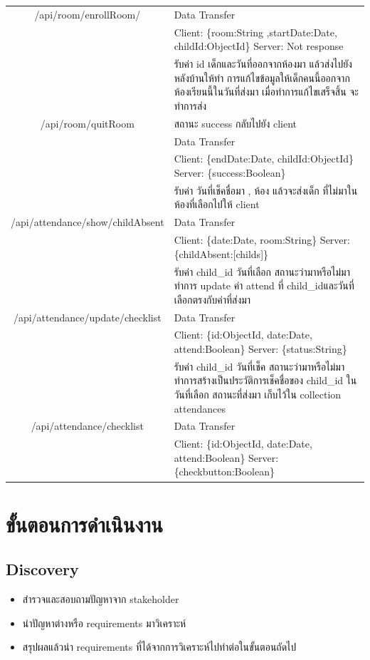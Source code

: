 \begin{landscape}
\begin{tabularx}{\linewidth}{|c|X|}
  {/api/room/enrollRoom/}& Data Transfer
  \\ &Client: \{room:String ,startDate:Date, childId:ObjectId\}
  Server: Not response
  \\ 
  \hline

  \hline
  
   & รับค่า id เด็กและวันที่ออกจากห้องมา แล้วส่งไปยังหลังบ้านให้ทำ
   การแก้ไขข้อมูลให้เด็กคนนี้ออกจากห้องเรียนนี้ในวันที่ส่งมา 
   เมื่อทำการแก้ไขเสร็จสิ้น จะทำการส่ง
  \\ {/api/room/quitRoom}& สถานะ success กลับไปยัง client\\
  & Data Transfer
  \\ &Client: \{endDate:Date, childId:ObjectId\}
  Server: \{success:Boolean\}
  \\ 
  \hline

  \hline
  
   & รับค่า วันที่เช็คชื่อมา , ห้อง แล้วจะส่งเด็ก 
   ที่ไม่มาในห้องที่เลือกไปให้ client
  \\
  {/api/attendance/show/childAbsent}& Data Transfer
  \\ &Client: \{date:Date, room:String\}
  Server: \{childAbsent:[childs]\}
  \\ 
  \hline

  \hline
   & รับค่า child\_id วันที่เลือก สถานะว่ามาหรือไม่มา
   ทำการ update ค่า attend ที่ child\_idและวันที่เลือกตรงกับค่าที่ส่งมา
  \\  
  {/api/attendance/update/checklist}& Data Transfer
  \\ &Client: \{id:ObjectId, date:Date, attend:Boolean\}
  Server: \{status:String\}
  \\ 
  \hline

  \hline
   & รับค่า child\_id วันที่เช็ค สถานะว่ามาหรือไม่มา
    ทำการสร้างเป็นประวัติการเช็คชื่อของ child\_id
  ในวันที่เลือก สถานะที่ส่งมา เก็บไว้ใน collection attendances
  \\
  {/api/attendance/checklist}& Data Transfer
  \\ &Client: \{id:ObjectId, date:Date, attend:Boolean\}
  Server: \{checkbutton:Boolean\}
  \\ 
  \hline

  \end{tabularx}
\end{landscape}
\section{ขั้นตอนการดำเนินงาน}
\subsection{Discovery}
\begin{itemize}
  \item สำรวจและสอบถามปัญหาจาก stakeholder
  \item นำปัญหาต่างหรือ requirements มาวิเคราะห์
  \item สรุปผลแล้วนำ requirements ที่ได้จากการวิเคราะห์ไปทำต่อในขั้นตอนถัดไป
\end{itemize}

